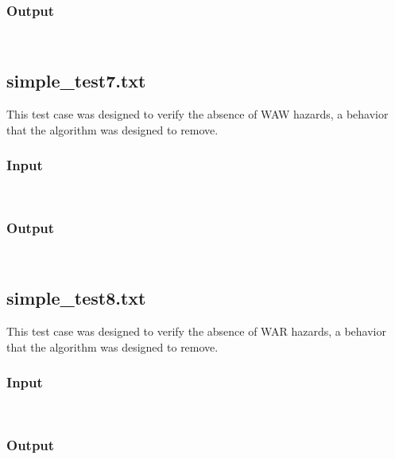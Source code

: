 \documentclass[12pt]{article}
\begin{document}
\subsubsection*{Output}
\begin{verbatim}
    
\end{verbatim}

\subsection{simple\_test7.txt}
This test case was designed to verify the absence of WAW hazards, a behavior that the algorithm was designed to remove.

\subsubsection*{Input}
\begin{verbatim}
    
\end{verbatim}

\subsubsection*{Output}
\begin{verbatim}
    
\end{verbatim}

\subsection{simple\_test8.txt}
This test case was designed to verify the absence of WAR hazards, a behavior that the algorithm was designed to remove.

\subsubsection*{Input}
\begin{verbatim}
    
\end{verbatim}

\subsubsection*{Output}
\begin{verbatim}
    
\end{verbatim}
\end{document}
